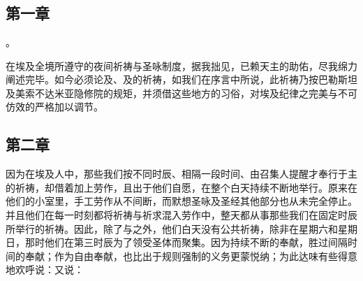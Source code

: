

\section{}


\subsection{第一章}

。\par

在埃及全境所遵守的夜间祈祷与圣咏制度，据我拙见，已赖天主的助佑，尽我绵力阐述完毕。如今必须论及、及的祈祷，如我们在序言中所说，此祈祷乃按巴勒斯坦及美索不达米亚隐修院的规矩，并须借这些地方的习俗，对埃及纪律之完美与不可仿效的严格加以调节。\par


\subsection{第二章}

\par

因为在埃及人中，那些我们按不同时辰、相隔一段时间、由召集人提醒才奉行于主的祈祷，却借着加上劳作，且出于他们自愿，在整个白天持续不断地举行。原来在他们的小室里，手工劳作从不间断，而默想圣咏及圣经其他部分也从未完全停止。并且他们在每一时刻都将祈祷与祈求混入劳作中，整天都从事那些我们在固定时辰所举行的祈祷。因此，除了与之外，他们白天没有公共祈祷，除非在星期六和星期日，那时他们在第三时辰为了领受圣体而聚集。因为持续不断的奉献，胜过间隔时间的奉献；作为自由奉献，也比出于规则强制的义务更蒙悦纳；为此达味有些得意地欢呼说：又说：\par

